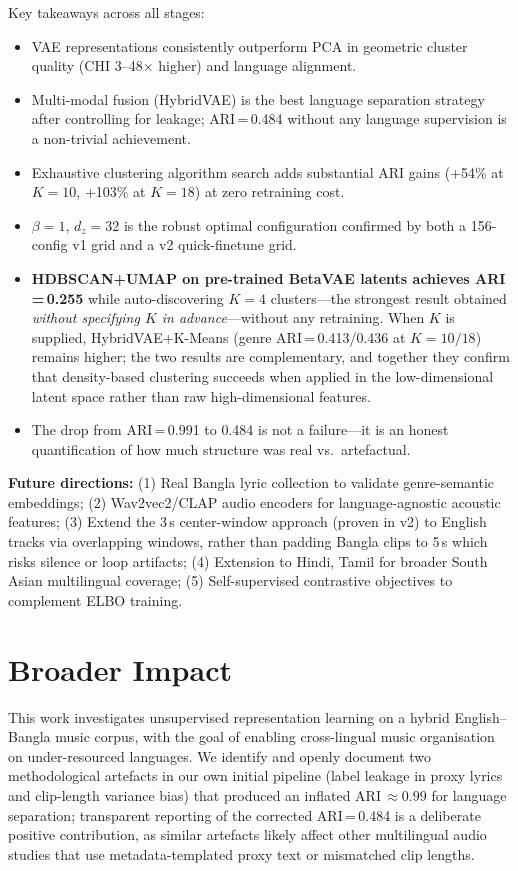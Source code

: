 \documentclass{article}
\begin{document}
Key takeaways across all stages:
\begin{itemize}
    \item VAE representations consistently outperform PCA in geometric cluster quality
          (CHI 3--48$\times$ higher) and language alignment.
    \item Multi-modal fusion (HybridVAE) is the best language separation strategy after
          controlling for leakage; ARI\,=\,0.484 without any language supervision is
          a non-trivial achievement.
    \item Exhaustive clustering algorithm search adds substantial ARI gains
          (+54\% at $K\!=\!10$, +103\% at $K\!=\!18$) at zero retraining cost.
    \item $\beta\!=\!1$, $d_z\!=\!32$ is the robust optimal configuration confirmed
          by both a 156-config v1 grid and a v2 quick-finetune grid.
    \item \textbf{HDBSCAN+UMAP on pre-trained BetaVAE latents achieves ARI\,=\,0.255}
          while auto-discovering $K\!=\!4$ clusters---the strongest result obtained
          \emph{without specifying $K$ in advance}---without any retraining. When $K$ is
          supplied, HybridVAE+K-Means (genre ARI\,=\,0.413/0.436 at $K\!=\!10/18$)
          remains higher; the two results are complementary, and together they confirm
          that density-based clustering succeeds when applied in the low-dimensional
          latent space rather than raw high-dimensional features.
    \item The drop from ARI\,=\,0.991 to 0.484 is not a failure---it is an honest
          quantification of how much structure was real vs.\ artefactual.
\end{itemize}

\textbf{Future directions:}
(1) Real Bangla lyric collection to validate genre-semantic embeddings;
(2) Wav2vec2/CLAP audio encoders for language-agnostic acoustic features;
(3) Extend the 3\,s center-window approach (proven in v2) to English tracks via overlapping windows, rather than padding Bangla clips to 5\,s which risks silence or loop artifacts;
(4) Extension to Hindi, Tamil for broader South Asian multilingual coverage;
(5) Self-supervised contrastive objectives to complement ELBO training.

\section*{Broader Impact}
This work investigates unsupervised representation learning on a hybrid English--Bangla
music corpus, with the goal of enabling cross-lingual music organisation on under-resourced
languages. We identify and openly document two methodological artefacts in our own
initial pipeline (label leakage in proxy lyrics and clip-length variance bias) that
produced an inflated ARI\,$\approx\!0.99$ for language separation; transparent reporting
of the corrected ARI\,=\,0.484 is a deliberate positive contribution, as similar
artefacts likely affect other multilingual audio studies that use metadata-templated
proxy text or mismatched clip lengths.
\end{document}
